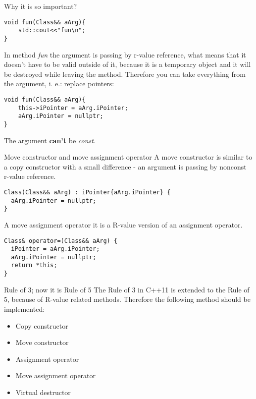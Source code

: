 \documentclass{beamer}
\begin{document}
\begin{frame}[fragile] {Why it is so important?}
\begin{lstlisting}[style=customcpp]
void fun(Class&& aArg){
	std::cout<<"fun\n";
}
\end{lstlisting}
In method \textit{fun} the argument is passing by r-value reference, what means that it doesn't have to be valid outside of it, because it is a temporary object and it will be destroyed while leaving the method.  Therefore you can take everything from the argument, i. e.: replace pointers:
\begin{lstlisting}[style=customcpp]
void fun(Class&& aArg){
	this->iPointer = aArg.iPointer;
	aArg.iPointer = nullptr;
}
\end{lstlisting}
The argument \textbf{can't} be \textit{const}.
\end{frame}


\begin{frame}[fragile] {Move constructor and move assignment operator}
A move constructor is similar to a copy constructor with a small difference - an argument is passing by nonconst r-value reference.
\begin{lstlisting}[style=customcpp]
Class(Class&& aArg) : iPointer{aArg.iPointer} {
  aArg.iPointer = nullptr;
}
\end{lstlisting}

A move assignment operator it is a R-value version of an assignment operator.
\begin{lstlisting}[style=customcpp]
Class& operator=(Class&& aArg) {
  iPointer = aArg.iPointer;
  aArg.iPointer = nullptr;
  return *this;
}
\end{lstlisting}
\end{frame}


\begin{frame}[fragile]{Rule of 3; now it is Rule of 5}
 The Rule of 3 in C++11 is extended to the Rule of 5, because of R-value related methods. Therefore the following method should be implemented: 
 \begin{itemize}
 \item Copy constructor
 \item Move constructor
 \item Assignment operator
 \item Move assignment operator 
 \item Virtual destructor
 \end{itemize}
\end{frame}
\end{document}
